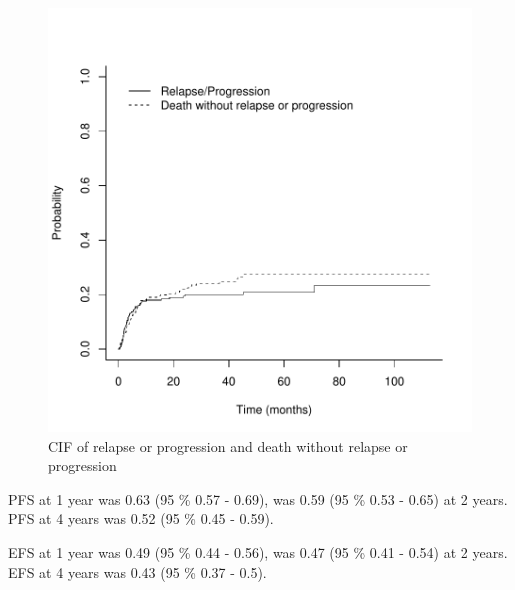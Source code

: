 \documentclass[a4paper,11pt] {article}
\begin{document}
\begin{figure}[h]
\begin{center}
\includegraphics{Rapport-fig6}
\end{center}
\caption{CIF of relapse or progression and death without relapse or progression}
\label{fig6}
\end{figure}


\pagebreak
PFS at 1 year was 0.63 (95 \% 0.57 - 0.69), was 0.59 (95 \% 0.53 - 0.65) at 2 years. PFS at 4 years was 0.52 (95 \% 0.45 - 0.59).


EFS at 1 year was 0.49 (95 \% 0.44 - 0.56), was 0.47 (95 \% 0.41 - 0.54) at 2 years. EFS at 4 years was 0.43 (95 \% 0.37 - 0.5).
\end{document}
